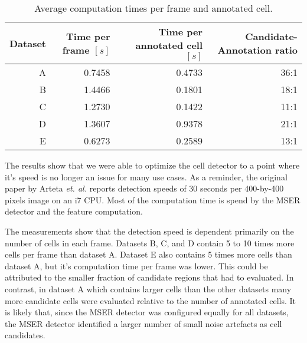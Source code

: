 		\begin{table}[h]
			\centering
			\begin{tabular}{rrrr}
				Dataset & Time per frame  $\left[ s \right]$ & Time per annotated cell  $\left[ s \right]$ & Candidate-Annotation ratio \\
			\hline
				      A &                             0.7458 &                                      0.4733 &                       36:1 \\
				      B &                             1.4466 &                                      0.1801 &                       18:1 \\
				      C &                             1.2730 &                                      0.1422 &                       11:1 \\
				      D &                             1.3607 &                                      0.9378 &                       21:1 \\
				      E &                             0.6273 &                                      0.2589 &                       13:1
			\end{tabular} 
			\caption{Average computation times per frame and annotated cell.}
			\label{tab:results_detector_speed}
		\end{table}

		The results show that we were able to optimize the cell detector to a point where it's speed is no longer an issue for many use cases. As a reminder, the original paper by Arteta \emph{et. al.} \cite{arteta12} reports detection speeds of 30 seconds per 400-by-400 pixels image on an i7 CPU. Most of the computation time is spend by the MSER detector and the feature computation.
		
		The measurements show that the detection speed is dependent primarily on the number of cells in each frame. Datasets B, C, and D contain 5 to 10 times more cells per frame than dataset A. Dataset E also contains 5 times more cells than dataset A, but it's computation time per frame was lower. This could be attributed to the smaller fraction of candidate regions that had to evaluated. In contrast, in dataset A which contains larger cells than the other datasets many more candidate cells were evaluated relative to the number of annotated cells. It is likely that, since the MSER detector was configured equally for all datasets, the MSER detector identified a larger number of small noise artefacts as cell candidates.
		
		
